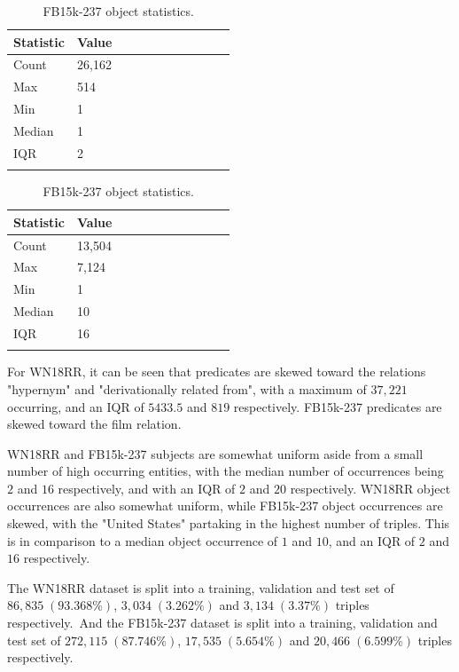 \begin{table}[H]
	\parbox{.5\linewidth}{
		\centering
		\begin{tabular}{lllllllllll}
  			\textbf{Statistic} & \textbf{Value}  \\
  			\hline
			Count & 26,162 \\
			Max & 514 \\
			Min & 1 \\
  			Median & 1 \\
  			IQR & 2 \\
			&
		\end{tabular}
		\caption{WN18RR object statistics.}
		}
	\hfill
	\parbox{.5\linewidth}{
		\centering
		\begin{tabular}{lllllllllll}
  			\textbf{Statistic} & \textbf{Value}  \\
  			\hline
			Count & 13,504 \\
			Max & 7,124 \\
			Min & 1 \\
  			Median & 10 \\
  			IQR & 16 \\
			&
		\end{tabular}
		\caption{FB15k-237 object statistics.}
		}
\end{table}

\noindent For WN18RR, it can be seen that predicates are skewed toward the relations "hypernym" and "derivationally related from", with a maximum of $ 37, 221 $ occurring, and an IQR of $ 5433.5 $ and $ 819 $ respectively. FB15k-237 predicates are skewed toward the film relation. \par

\noindent WN18RR and FB15k-237 subjects are somewhat uniform aside from a small number of high occurring entities, with the median number of occurrences being $ 2 $ and $ 16 $ respectively, and with an IQR of $ 2 $ and $ 20 $ respectively. WN18RR object occurrences are also somewhat uniform, while FB15k-237 object occurrences are skewed, with the "United States" partaking in the highest number of triples. This is in comparison to a median object occurrence of $ 1 $ and $ 10 $, and an IQR of $ 2 $ and $ 16 $ respectively. \par

\noindent The WN18RR dataset is split into a training, validation and test set of $ 86, 835 \; (93.368 \%) $, $ 3, 034 \; (3.262 \%) $ and $ 3, 134\; (3.37 \%) $ triples respectively.\ And the FB15k-237 dataset is split into a training, validation and test set of $ 272, 115 \; (87.746 \%) $, $ 17, 535 \; (5.654 \%) $ and $ 20, 466 \; (6.599 \%) $ triples respectively. \par


